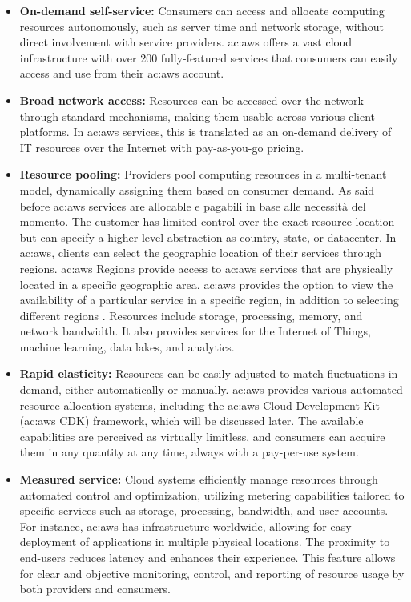 \begin{itemize}
    \item \textbf{On-demand self-service:} Consumers can access and allocate computing resources autonomously, such as server time and network storage, without direct involvement with service providers. \gls{ac:aws} offers a vast cloud infrastructure with over 200 fully-featured services that consumers can easily access and use from their \gls{ac:aws} account.
    \item \textbf{Broad network access:} Resources can be accessed over the network through standard mechanisms, making them usable across various client platforms. In \gls{ac:aws} services, this is translated as an on-demand delivery of IT resources over the Internet with pay-as-you-go pricing. 
    \item \textbf{Resource pooling:} Providers pool computing resources in a multi-tenant model, dynamically assigning them based on consumer demand. As said before \gls{ac:aws} services are allocable e pagabili in base alle necessità del momento. The customer has limited control over the exact resource location but can specify a higher-level abstraction as country, state, or datacenter. In \gls{ac:aws}, clients can select the geographic location of their services through regions. \gls{ac:aws} Regions provide access to \gls{ac:aws} services that are physically located in a specific geographic area. \gls{ac:aws} provides the option to view the availability of a particular service in a specific region, in addition to selecting different regions \cite{AWSRegions}. Resources include storage, processing, memory, and network bandwidth. It also provides services for the Internet of Things, machine learning, data lakes, and analytics.
    \item \textbf{Rapid elasticity:} Resources can be easily adjusted to match fluctuations in demand, either automatically or manually. \gls{ac:aws} provides various automated resource allocation systems, including the \gls{ac:aws} Cloud Development Kit (\gls{ac:aws} CDK) framework, which will be discussed later. The available capabilities are perceived as virtually limitless, and consumers can acquire them in any quantity at any time, always with a pay-per-use system.
    \item \textbf{Measured service:} Cloud systems efficiently manage resources through automated control and optimization, utilizing metering capabilities tailored to specific services such as storage, processing, bandwidth, and user accounts. For instance, \gls{ac:aws} has infrastructure worldwide, allowing for easy deployment of applications in multiple physical locations. The proximity to end-users reduces latency and enhances their experience. This feature allows for clear and objective monitoring, control, and reporting of resource usage by both providers and consumers.
\end{itemize}

